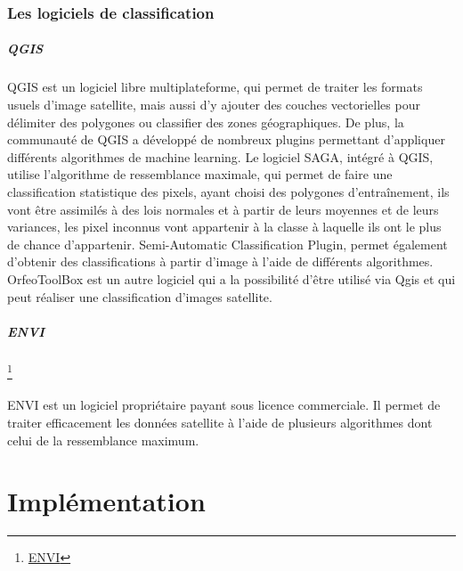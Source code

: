 \documentclass[a4paper,10pt]{report}
\begin{document}
\subsection{Les logiciels de classification}
\paragraph{QGIS}
\paragraph{}
QGIS est un logiciel libre multiplateforme, qui permet de traiter les formats usuels d'image satellite, mais aussi d'y ajouter des couches vectorielles pour délimiter des polygones ou classifier des zones géographiques.
De plus, la communauté de QGIS a développé de nombreux plugins permettant d'appliquer différents algorithmes de machine learning.\newline
Le logiciel SAGA, intégré à QGIS, utilise l'algorithme de ressemblance maximale, qui permet de faire une classification statistique des pixels, ayant choisi des polygones d’entraînement, ils vont être assimilés à des lois normales et à partir de leurs moyennes et de leurs variances, les pixel inconnus vont appartenir à la classe à laquelle ils ont le plus de chance d'appartenir.
Semi-Automatic Classification Plugin, permet également d'obtenir des classifications à partir d'image à l'aide de différents algorithmes.
OrfeoToolBox est un autre logiciel qui a la possibilité d'être utilisé via Qgis et qui peut réaliser une classification d'images satellite.

\paragraph{ENVI}\footnote{\href{http://www.exelisvis.fr/ProduitsetServices/LesproduitsENVI/ENVI.aspx}{ENVI}}
\paragraph{}
ENVI est un logiciel propriétaire payant sous licence commerciale. Il permet de traiter efficacement les données satellite à l'aide de plusieurs algorithmes dont celui de la ressemblance maximum.
\paragraph{}

\chapter{Implémentation}
\end{document}
